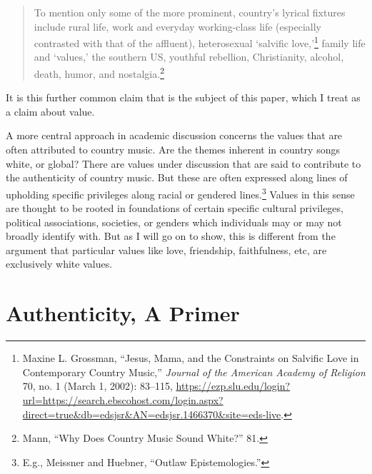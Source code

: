 \documentclass[phdthesis,12pt,final]{wuthesis}
\theoremstyle{definition}
\theoremstyle{definition}
\theoremstyle{definition}
\theoremstyle{definition}
\theoremstyle{remark}
\begin{document}
\begin{quote}
To mention only some of the more prominent, country's lyrical fixtures include rural life, work and everyday working-class life (especially contrasted with that of the affluent), heterosexual `salvific love,'\footnote{Maxine L. Grossman, {``Jesus, {Mama}, and the {Constraints} on {Salvific Love} in {Contemporary Country Music},''} \emph{Journal of the American Academy of Religion} 70, no. 1 (March 1, 2002): 83--115, \url{https://ezp.slu.edu/login?url=https://search.ebscohost.com/login.aspx?direct=true&db=edsjsr&AN=edsjsr.1466370&site=eds-live}.} family life and `values,' the southern US, youthful rebellion, Christianity, alcohol, death, humor, and nostalgia.\footnote{Mann, {``Why Does Country Music Sound White?''} 81.}
\end{quote}

It is this further common claim that is the subject of this paper, which I treat as a claim about value.

A more central approach in academic discussion concerns the values that are often attributed to country music. Are the themes inherent in country songs white, or global? There are values under discussion that are said to contribute to the authenticity of country music. But these are often expressed along lines of upholding specific privileges along racial or gendered lines.\footnote{E.g., Meissner and Huebner, {``Outlaw Epistemologies.''}} Values in this sense are thought to be rooted in foundations of certain specific cultural privileges, political associations, societies, or genders which individuals may or may not broadly identify with. But as I will go on to show, this is different from the argument that particular values like love, friendship, faithfulness, etc, are exclusively white values.

\section{Authenticity, A Primer}\label{authenticity-a-primer}
\end{document}
